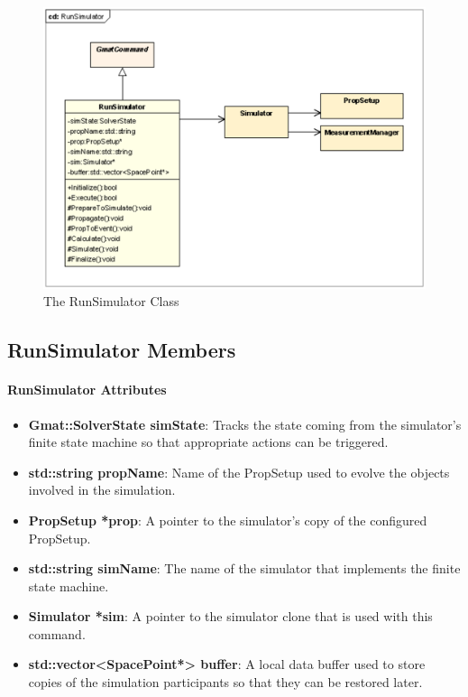 \begin{figure}[htbp]
\begin{center}
\includegraphics[scale=0.6]{Images/RunSimulator.eps}
\caption{\label{fig:RunSimulatorClass}The RunSimulator Class}
\end{center}
\end{figure}

\subsection{RunSimulator Members}

\paragraph{RunSimulator Attributes}

\begin{itemize}
\item \textbf{Gmat::SolverState simState}:  Tracks the state coming from the simulator's finite state machine so that appropriate actions can be triggered.
\item \textbf{std::string propName}:  Name of the PropSetup used to evolve the objects involved in the simulation.
\item \textbf{PropSetup *prop}:  A pointer to the simulator's copy of the configured PropSetup.
\item \textbf{std::string simName}:  The name of the simulator that implements the finite state machine.
\item \textbf{Simulator *sim}: A pointer to the simulator clone that is used with this command.
\item \textbf{std::vector<SpacePoint*> buffer}:  A local data buffer used to store copies of the simulation participants so that they can be restored later.
\end{itemize}

